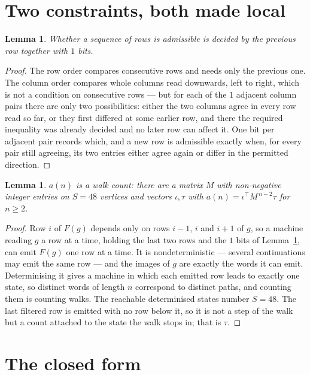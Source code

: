 \documentclass[11pt,a4paper]{article}
\theoremstyle{plain}
\newtheorem{lemma}[theorem]{Lemma}
\theoremstyle{definition}
\begin{document}
\section{Two constraints, both made local}

\begin{lemma}\label{lem:local}
Whether a sequence of rows is admissible is decided by the previous row together with
$1$ bits.
\end{lemma}

\begin{proof}
The row order compares consecutive rows and needs only the previous one. The column order
compares whole columns read downwards, left to right, which is not a condition on consecutive
rows --- but for each of the $1$ adjacent column pairs there are only two possibilities:
either the two columns agree in every row read so far, or they first differed at some earlier
row, and there the required inequality was already decided and no later row can affect it. One
bit per adjacent pair records which, and a new row is admissible exactly when, for every pair
still agreeing, its two entries either agree again or differ in the permitted direction.
\end{proof}

\begin{lemma}\label{lem:det}
$a(n)$ is a walk count: there are a matrix $M$ with non-negative integer entries on $S=48$
vertices and vectors $\iota,\tau$ with $a(n)=\iota^{\!\top}M^{\,n-2}\tau$ for $n\ge2$.
\end{lemma}

\begin{proof}
Row $i$ of $F(g)$ depends only on rows $i-1$, $i$ and $i+1$ of $g$, so a machine reading $g$ a
row at a time, holding the last two rows and the $1$ bits of Lemma~\ref{lem:local}, can
emit $F(g)$ one row at a time. It is nondeterministic --- several continuations may emit the
same row --- and the images of $g$ are exactly the words it can emit. Determinising it gives a
machine in which each emitted row leads to exactly one state, so distinct words of length $n$
correspond to distinct paths, and counting them is counting walks. The reachable determinised
states number $S=48$. The last filtered row is emitted with no row below it, so it is not a
step of the walk but a count attached to the state the walk stops in; that is $\tau$.
\end{proof}

\section{The closed form}
\end{document}
